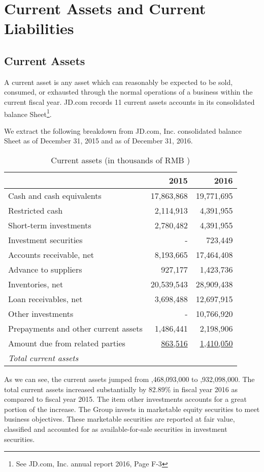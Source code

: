 \section{Current Assets and Current Liabilities}
\subsection{Current Assets}
A current asset is any asset which can reasonably be expected to be sold, consumed, or exhausted through the normal operations of a business within the current fiscal year. JD.com records 11 current assets accounts in its consolidated balance Sheet\footnote{See JD.com, Inc. annual report 2016, Page F-3}. 

We extract the following breakdown from JD.com, Inc. consolidated balance Sheet as of December 31, 2015 and as of December 31, 2016.\\

\begin{table}[H]	
\begin{center}
	\begin{tabular}{lrr}
		\toprule
		&\textbf{2015}&\textbf{2016}\\
		\midrule
		Cash and cash equivalents&17,863,868&19,771,695\\
		Restricted cash&2,114,913&4,391,955\\
		Short-term investments&2,780,482&4,391,955\\
		Investment securities&-&723,449\\
		Accounts receivable, net&8,193,665&17,464,408\\
		Advance to suppliers&927,177&1,423,736\\
		Inventories, net&20,539,543&28,909,438\\
		Loan receivables, net&3,698,488&12,697,915\\
		Other investments&-&10,766,920\\
		Prepayments and other current assets&1,486,441&2,198,906\\
		Amount due from related parties&\underline{863,516}&\underline{1,410,050}\\
		\qquad\emph{Total current assets}&\uuline{58,468,093}&\uuline{106,932,098}\\
		\bottomrule
	\end{tabular}
\end{center}
	\caption{Current assets (in thousands of RMB \textyen)}\label{table:1}
\end{table}
As we can see, the current assets jumped from ,468,093,000 to ,932,098,000. The total current assets increased substantially by 82.89\% in fiscal year 2016 as compared to fiscal year 2015. The item other investments accounts for a great portion of the increase. The Group invests in marketable equity securities to meet business objectives. These marketable securities are reported at fair value, classified and
accounted for as available-for-sale securities in investment securities.

